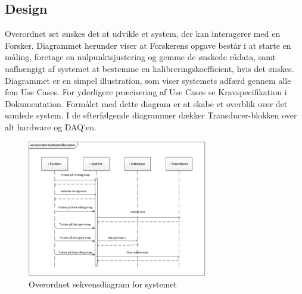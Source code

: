 \subsection{Design}
Overordnet set ønskes det at udvikle et system, der kan interagerer med en Forsker. Diagrammet herunder viser at Forskerens opgave består i at starte en måling, foretage en nulpunktsjustering og gemme de ønskede rådata, samt uafhængigt af systemet at bestemme en kalibreringskoefficient, hvis det ønskes. Diagrammet er en simpel illustration, som viser systemets adfærd gennem alle fem Use Cases. For yderligere præcisering af Use Cases se Kravspecifikation i Dokumentation. Formålet med dette diagram er at skabe et overblik over det samlede system. I de efterfølgende diagrammer dækker Transducer-blokken over alt hardware og DAQ'en. 
\begin{figure}[H]
	\centering
	\includegraphics[width=0.7\textwidth]{Figurer/OverordnetSD}
	\caption{Overordnet sekvensdiagram for systemet}
	\label{fig:Overordnet sekvensdiagram}
\end{figure}

